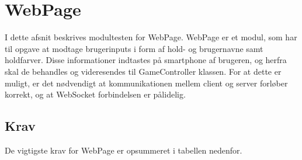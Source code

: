 \documentclass[Modultest/Modultest_main.tex]{subfiles}
\begin{document}
\lstset{style=customc}

\section{WebPage}\label{sec:webpage_modultest}
I dette afsnit beskrives modultesten for WebPage. WebPage er et modul, som har til opgave at modtage brugerinputs i form af hold- og brugernavne samt holdfarver. Disse informationer indtastes på smartphone af brugeren, og herfra skal de behandles og videresendes til GameController klassen. For at dette er muligt, er det nødvendigt at kommunikationen mellem client og server forløber korrekt, og at WebSocket forbindelsen er pålidelig.

\subsection{Krav}
De vigtigste krav for WebPage er opsummeret i tabellen nedenfor.
\end{document}
